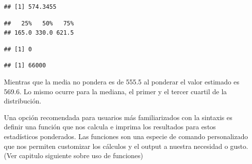 \documentclass[
]{book}
\newenvironment{Shaded}{\begin{snugshade}}{\end{snugshade}}
\newcommand{\AttributeTok}[1]{\textcolor[rgb]{0.77,0.63,0.00}{#1}}
\newcommand{\FloatTok}[1]{\textcolor[rgb]{0.00,0.00,0.81}{#1}}
\newcommand{\FunctionTok}[1]{\textcolor[rgb]{0.00,0.00,0.00}{#1}}
\newcommand{\NormalTok}[1]{#1}
\newcommand{\SpecialCharTok}[1]{\textcolor[rgb]{0.00,0.00,0.00}{#1}}
\begin{document}
\begin{verbatim}
## [1] 574.3455
\end{verbatim}

\begin{Shaded}
\end{Shaded}

\begin{verbatim}
##   25%   50%   75% 
## 165.0 330.0 621.5
\end{verbatim}

\begin{Shaded}
\end{Shaded}

\begin{verbatim}
## [1] 0
\end{verbatim}

\begin{Shaded}
\end{Shaded}

\begin{verbatim}
## [1] 66000
\end{verbatim}

Mientras que la media no pondera es de 555.5 al ponderar el valor estimado es 569.6. Lo mismo ocurre para la mediana, el primer y el tercer cuartil de la distribución.

Una opción recomendada para usuarios más familiarizados con la sintaxis es definir una función que nos calcula e imprima los resultados para estos estadísticos ponderados. Las funciones son una especie de comando personalizado que nos permiten customizar los cálculos y el output a nuestra necesidad o gusto. (Ver capitulo siguiente sobre uso de funciones)
\end{document}
